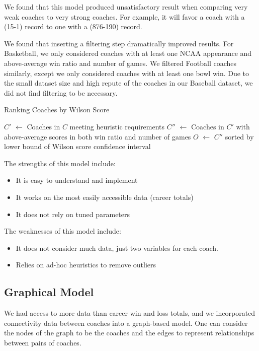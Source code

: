 \documentclass[titlepage]{article}
\newcommand*\Let[2]{\State #1 $\gets$ #2}
\begin{document}
We found that this model produced unsatisfactory result when comparing very weak coaches to very strong coaches. For example, it will favor a coach with a (15-1) record to one with a (876-190) record.

We found that inserting a filtering step dramatically improved results. For Basketball, we only considered coaches with at least one NCAA appearance and above-average win ratio and number of games. We filtered Football coaches similarly, except we only considered coaches with at least one bowl win. Due to the small dataset size and high repute of the coaches in our Baseball dataset, we did not find filtering to be necessary.

\renewcommand{\algorithmicrequire}{\textbf{Input:}}
\renewcommand{\algorithmicensure}{\textbf{Output:}}
\begin{algorithm}[H]
  \caption{Ranking Coaches by Wilson Score}
  \begin{algorithmic}
	\Let{$C'$}{Coaches in $C$ meeting heuristic requirements}
	\Let{$C''$}{Coaches in $C'$ with above-average scores in both win ratio and number of games}
	\Let{$O$}{$C''$ sorted by lower bound of Wilson score confidence interval}
  \end{algorithmic}
\end{algorithm}

\noindent The strengths of this model include:
\begin{itemize}
\item It is easy to understand and implement
\item It works on the most easily accessible data (career totals)
\item It does not rely on tuned parameters
\end{itemize}

\noindent The weaknesses of this model include:
\begin{itemize}
\item It does not consider much data, just two variables for each coach.
\item Relies on ad-hoc heuristics to remove outliers
\end{itemize}

\subsection{Graphical Model}
We had access to more data than career win and loss totals, and we incorporated connectivity data between coaches into a graph-based model. One can consider the nodes of the graph to be the coaches and the edges to represent relationships between pairs of coaches.
\end{document}

